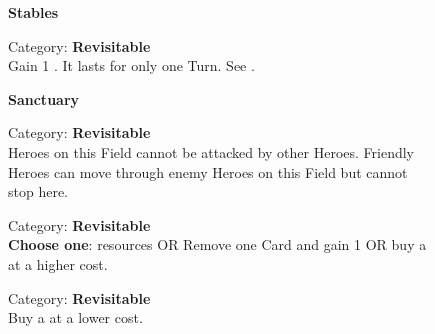 \begin{figure}[H]
  \begin{minipage}[t]{0.47\textwidth}
    \vspace{0pt}
    \centering
    \phantom{j}\textbf{Stables}\phantom{j}\par
    \caption{\small Category: \textbf{Revisitable}\\
      Gain 1 .
      It lasts for only one Turn.
      See \protect{}.
    }
  \end{minipage}\hfill
  \begin{minipage}[t]{0.47\textwidth}
    \vspace{0pt}
    \centering
    \textbf{Sanctuary}\par
    \caption{\small Category: \textbf{Revisitable}\\
      Heroes on this Field cannot be attacked by other Heroes.
      Friendly Heroes can move through enemy Heroes on this Field but cannot stop here.}
  \end{minipage}
\end{figure}

\begin{figure}[H]
  \begin{minipage}[t]{0.47\textwidth}
    \vspace{0pt}
    \centering
    \par
    \caption{\small Category: \textbf{Revisitable}\\
      \textbf{Choose one}: \protect{} resources OR Remove one Card and gain 1  OR buy a \protect{} at a higher cost.
    }
  \end{minipage}\hfill
  \begin{minipage}[t]{0.47\textwidth}
    \vspace{0pt}
    \centering
    \phantom{j}\par
    \caption{\small Category: \textbf{Revisitable}\\Buy a \protect{} at a lower cost.\phantom{.......}}
  \end{minipage}
\end{figure}

